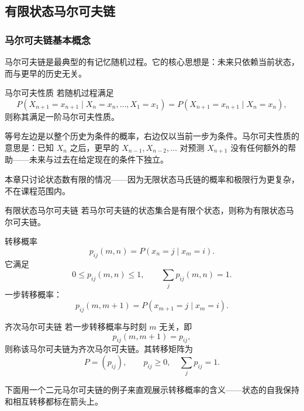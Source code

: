 \subsection{有限状态马尔可夫链}

\subsubsection{马尔可夫链基本概念}
马尔可夫链是最典型的有记忆随机过程。它的核心思想是：未来只依赖当前状态，而与更早的历史无关。

\begin{definitionBox}{马尔可夫性质}
若随机过程满足
\[
 P(X_{n+1}=x_{n+1}\mid X_n=x_n,\dots,X_1=x_1)=P(X_{n+1}=x_{n+1}\mid X_n=x_n),
\]
则称其满足一阶马尔可夫性质。

\noindent 等号左边是以整个历史为条件的概率，右边仅以当前一步为条件。马尔可夫性质的意思是：已知 $X_n$ 之后，更早的 $X_{n-1},X_{n-2},\dots$ 对预测 $X_{n+1}$ 没有任何额外的帮助——未来与过去在给定现在的条件下独立。
\end{definitionBox}

本章只讨论状态数有限的情况——因为无限状态马氏链的概率和极限行为更复杂，不在课程范围内。

\begin{definitionBox}{有限状态马尔可夫链}
若马尔可夫链的状态集合是有限个状态，则称为有限状态马尔可夫链。
\end{definitionBox}

\begin{formulaBox}{转移概率}
\[
 p_{ij}(m,n)=P(x_n=j\mid x_m=i).
\]
它满足
\[
 0\le p_{ij}(m,n)\le 1,\qquad \sum_j p_{ij}(m,n)=1.
\]
一步转移概率：
\[
 p_{ij}(m,m+1)=P(x_{m+1}=j\mid x_m=i).
\]
\end{formulaBox}

\begin{definitionBox}{齐次马尔可夫链}
若一步转移概率与时刻 $m$ 无关，即
\[
 p_{ij}(m,m+1)=p_{ij},
\]
则称该马尔可夫链为齐次马尔可夫链。其转移矩阵为
\[
 P=(p_{ij}),\qquad p_{ij}\ge0,\quad \sum_j p_{ij}=1.
\]
\end{definitionBox}

下面用一个二元马尔可夫链的例子来直观展示转移概率的含义——状态的自我保持和相互转移都标在箭头上。

